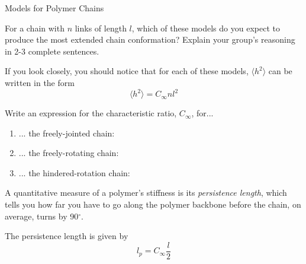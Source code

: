 \begin{activity}{Models for Polymer Chains}
\begin{model}
\begin{enumerate}
	\end{enumerate}
	
\end{model}

\begin{ctqs}
	\question For a chain with $n$ links of length $l$, which of these models do you expect to produce the most extended chain conformation?  Explain your group's reasoning in 2-3 complete sentences. \label{\labelbase:ctq:stiffness}
	
		\begin{solution}[1.5in]
		\end{solution}
	
	\question If you look closely, you should notice that for each of these models, $\langle h^2\rangle$ can be written in the form \label{\labelbase:ctq:C}
		\begin{equation*}
			\langle h^2 \rangle = C_\infty n l^2
		\end{equation*}
		
		Write an expression for the characteristic ratio, $C_\infty$, for...
		
		\begin{enumerate}
			\item ... the freely-jointed chain:
	
		\begin{solution}[0.75in]
		\end{solution}
			
			\item ... the freely-rotating chain:
	
		\begin{solution}[0.75in]
		\end{solution}
			
			\item ... the hindered-rotation chain:
	
		\begin{solution}[0.75in]
		\end{solution}
		\end{enumerate}
		
\end{ctqs}

\begin{infobox}

A quantitative measure of a polymer's stiffness is its \emph{persistence length}, which tells you how far you have to go along the polymer backbone before the chain, on average, turns by 90$^\circ$.
	
		The persistence length is given by
		\begin{equation*}
			l_p = C_\infty \frac{l}{2}
		\end{equation*}
		

\end{infobox}
\end{activity}
